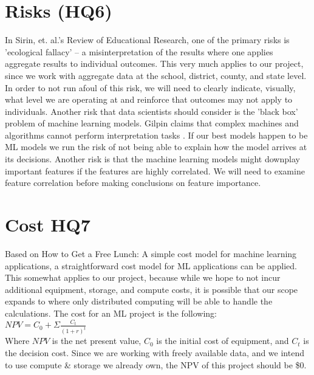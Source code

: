 \documentclass[sigconf,nonacm,11pt]{acmart}
\begin{document}
\section{Risks (HQ6)}
In Sirin, et. al.'s Review of Educational Research, one of the primary risks is 'ecological fallacy' \cite{sirin} -- a misinterpretation of the results where one applies aggregate results to individual outcomes. This very much applies to our project, since we work with aggregate data at the school, district, county, and state level.  In order to not run afoul of this risk, we will need to clearly indicate, visually, what level we are operating at and reinforce that outcomes may not apply to individuals.  Another risk that data scientists should consider is the 'black box' problem of machine learning models. Gilpin claims that complex machines and algorithms cannot perform interpretation tasks \cite{gilpin}.  If our best models happen to be ML models we run the risk of not being able to explain how the model arrives at its decisions. Another risk is that the machine learning models might downplay important features if the features are highly correlated. We will need to examine feature correlation before making conclusions on feature importance.

\section{Cost HQ7}
Based on How to Get a Free Lunch: A simple cost model for machine learning applications, a straightforward cost model for ML applications can be applied. \cite{domingos} This somewhat applies to our project, because while we hope to not incur additional equipment, storage, and compute costs, it is possible that our scope expands to where only distributed computing will be able to handle the calculations.  The cost for an ML project is the following:\\
$NPV = C_0 + \Sigma{\frac{C_t}{(1+r)^t}}$\\
Where $NPV$ is the net present value, $C_0$ is the initial cost of equipment, and $C_t$ is the decision cost. Since we are working with freely available data, and we intend to use compute \& storage we already own, the NPV of this project should be \$0.
\end{document}
